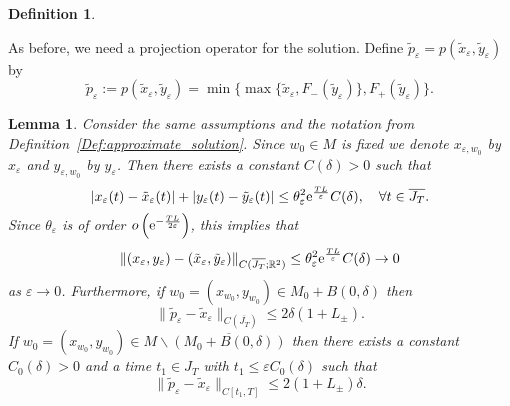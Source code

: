 \documentclass[12pt]{article}
\newtheorem{lem}[thm]{Lemma}
\newtheorem{defn}[thm]{Definition}
\def\txte{{\textnormal{e}}}
\newcommand{\be}{\begin{equation}}
\newcommand{\ee}{\end{equation}}
\newcommand{\benn}{\begin{equation*}}
\newcommand{\eenn}{\end{equation*}}
\begin{document}
\begin{defn}
\end{defn}

As before, we need a projection operator for the solution. Define  
$\tilde{p}_{\varepsilon}=p(\tilde{x}_\varepsilon,\tilde{y}_\varepsilon)$ by
\be
\label{eq:deftildeproject}
\tilde{p}_{\varepsilon}:= p(\tilde{x}_\varepsilon,\tilde{y}_\varepsilon) 
= \min\{\max\{\tilde{x}_\varepsilon, F_-(\tilde{y}_\varepsilon)\},
F_+(\tilde{y}_\varepsilon)\}.
\ee
		
\begin{lem}
\label{Lem:estim:time_approx_sol}
Consider the same assumptions and the notation 
from Definition~\ref{Def:approximate_solution}. Since $w_0\in M$ is fixed
we denote $x_{\varepsilon,w_0}$ by $x_\varepsilon$ and $y_{\varepsilon,w_0}$ 
by $y_\varepsilon$. Then there exists a constant $C(\delta)>0$ such that
\be
\label{eq:lemtilde1}
| x_\varepsilon(t) - \tilde{x}_\varepsilon(t)|
+ | y_\varepsilon(t) - \tilde{y}_\varepsilon(t)|\leq 
\theta_\varepsilon^2\txte^{\frac{TL}{\varepsilon}}C(\delta),\quad
\text{$\forall t\in \overline{J_T}$.}
\ee
Since $\theta_\varepsilon$ is of order 
$o\left(\txte^{-\frac{TL}{2\varepsilon}}\right)$, this implies that
\benn
\|(x_\varepsilon,y_\varepsilon) - 
(\tilde{x}_\varepsilon,\tilde{y}_\varepsilon)\|_{C(\overline{J_T};\mathbb{R}^2)} 
\leq \theta_\varepsilon^2\txte^{\frac{TL}{\varepsilon}}C(\delta)\rightarrow 0
\eenn
as $\varepsilon\rightarrow 0$. Furthermore, if 
$w_0=(x_{w_0},y_{w_0})\in M_0+B(0,\delta)$ then 
\be
\label{eq:lemtilde2}
\|\tilde{p}_\varepsilon - \tilde{x}_\varepsilon\|_{C(\overline{J_T})} 
\leq 2\delta(1+L_\pm).
\ee
If $w_0=(x_{w_0},y_{w_0})\in M\backslash \overline{(M_0+B(0,\delta))}$ 
then there exists a constant $C_0(\delta)>0$ and a time $t_1\in J_T$ with
$t_1 \leq \varepsilon C_0(\delta)$ such that
\be
\label{eq:lemtilde3}
\|\tilde{p}_\varepsilon - \tilde{x}_\varepsilon\|_{C[t_1,T]} 
\leq 2(1+L_\pm)\delta.
\ee
\end{lem}
\end{document}
